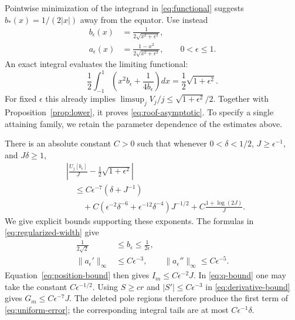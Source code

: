 \documentclass[aps,pra,reprint,superscriptaddress,longbibliography]{revtex4-2}
\theoremstyle{remark}
\newcommand{\norm}[1]{\lVert#1\rVert}
\begin{document}
Pointwise minimization of the integrand in \eqref{eq:functional}
suggests $b_*(x)=1/(2|x|)$ away from the equator. Use instead
\begin{equation}
\begin{aligned}
b_\epsilon(x)&=\frac1{2\sqrt{x^2+\epsilon^2}},\\
a_\epsilon(x)&=\frac{1-x^2}{2\sqrt{x^2+\epsilon^2}},
\qquad 0<\epsilon\leq1.
\end{aligned}
\label{eq:regularized-width}
\end{equation}
An exact integral evaluates the limiting functional:
\begin{equation}
 \frac12\int_{-1}^1\left(x^2b_\epsilon+\frac1{4b_\epsilon}\right)dx
 =\frac12\sqrt{1+\epsilon^2}.
 \label{eq:integral}
\end{equation}
For fixed $\epsilon$ this already implies
$\limsup_jV_j/j\leq\sqrt{1+\epsilon^2}/2$. Together with
Proposition~\ref{prop:lower}, it proves \eqref{eq:roof-asymptotic}.
To specify a single attaining family, we retain the parameter
dependence of the estimates above.

There is an absolute constant $C>0$ such that whenever
$0<\delta<1/2$, $J\geq\epsilon^{-1}$, and $J\delta\geq1$,
\begin{equation}
\begin{aligned}
&\left|\frac{U_j[b_\epsilon]}J-\frac12\sqrt{1+\epsilon^2}\right|\\
&\quad\leq C\epsilon^{-7}(\delta+J^{-1})\\
&\qquad{}+C(\epsilon^{-2}\delta^{-6}
             +\epsilon^{-12}\delta^{-4})J^{-1/2}
       +C\frac{1+\log(2J)}J.
\end{aligned}
\label{eq:uniform-error}
\end{equation}
We give explicit bounds supporting these exponents. The formulas
in \eqref{eq:regularized-width} give
\begin{equation}
\begin{aligned}
\frac1{2\sqrt2}&\leq b_\epsilon\leq\frac1{2\epsilon},\\
\norm{a_\epsilon'}_\infty&\leq C\epsilon^{-3},\qquad
\norm{a_\epsilon''}_\infty\leq C\epsilon^{-5}.
\end{aligned}
\label{eq:parameter-bounds}
\end{equation}
Equation~\eqref{eq:position-bound} then gives
$I_m\leq C\epsilon^{-2}J$. In \eqref{eq:q-bound} one may take the
constant $C\epsilon^{-1/2}$. Using $S\geq cr$ and
$|S'|\leq C\epsilon^{-3}$ in \eqref{eq:derivative-bound} gives
$G_m\leq C\epsilon^{-7}J$. The deleted pole regions therefore
produce the first term of \eqref{eq:uniform-error}; the corresponding
integral tails are at most $C\epsilon^{-1}\delta$.
\end{document}
